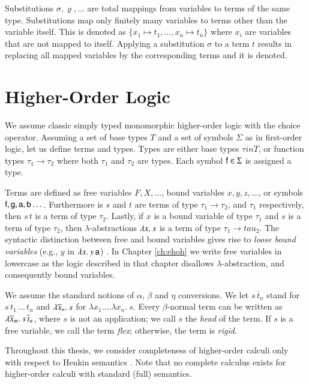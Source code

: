 Substitutions $\sigma, \varrho, \ldots$ are total mappings from variables to
terms of the same type. Substitutions map only finitely many variables to terms
other than the variable itself. This is denoted as $\{ x_1 \mapsto t_1, \ldots,
x_n \mapsto t_n \}$ where $x_i$ are variables that are not mapped to itself.
Applying a substitution $\sigma$ to a term $t$ results in replacing all mapped
variables by the corresponding terms and it is denoted.

\section{Higher-Order Logic}

We assume classic simply typed monomorphic higher-order logic with the choice
operator. Assuming a set of base types $T$ and a set of symbols $\Sigma$ as in
first-order logic, let us define terms and types. Types are either base types
$\tau in T$, or function types $\tau_1 \rightarrow \tau_2$ where both $\tau_1$
and $\tau_2$ are types. Each symbol $\mathsf{f} \in \Sigma$ is assigned a type.

Terms are defined as free variables $F, X, \ldots$, bound variables $x, y, z,
\dotsc$, or symbols $\mathsf{f}, \mathsf{g},\allowbreak \mathsf{a},\allowbreak \mathsf{b}
\dotsc$. Furthermore is $s$ and $t$ are terms of type $\tau_1 \rightarrow
\tau_2$, and $\tau_1$ respectively, then $s \, t$ is a term of type $\tau_2$.
Lastly, if $x$ is a bound variable of type $\tau_1$ and $s$ is a term of type
$\tau_2$, then $\lambda$-abstractions $\lambda x.\> s$ is a term of type $\tau_1
\rightarrow tau_2$. The syntactic distinction between free and bound variables
gives rise to \emph{loose bound variables} (e.g., $y$ in $\lambda x.\> y \, \mathsf{a}$)
\cite{tn-93-patterns}. In Chapter \ref{ch:ehoh} we write free variables in
lowercase as the logic described in that chapter disallows
$\lambda$-abstraction, and consequently bound variables.

We assume the standard notions of $\alpha$, $\beta$ and $\eta$ conversions. We
let $s \, \overline{t}_n$ stand for $s \, t_1 \, \ldots \, t_n$ and
$\lambda \overline{x}_n.\> s$ for $\lambda x_1. \ldots \lambda x_n. \> s$. Every
$\beta$-normal term can be written as $\lambda \overline{x}_{m}.\> s \, \overline{t}_{n}$,
where $s$ is not an application; we call $s$ the \emph{head} of the term. If $s$
is a free variable, we call the term \emph{flex}; otherwise, the term is
\emph{rigid}.

Throughout this thesis, we consider completeness of higher-order calculi only
with respect to Henkin semantics \cite{bm-14-automation-ho}. Note that no
complete calculus exists for higher-order calculi with standard (full) semantics.

